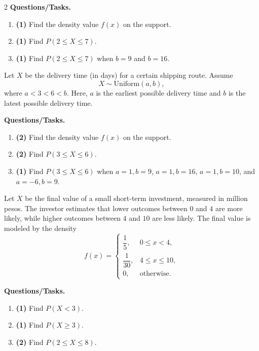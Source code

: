 \begin{multicols}{2}
		\textbf{Questions/Tasks.}
		\begin{enumerate}[label=\textbf{\alph*)}]
			\item \textbf{(1)} Find the density value $f(x)$ on the support.
			\item \textbf{(1)} Find $P(2\le X\le 7)$.
			\item \textbf{(1)} Find $P(2\le X\le 7)$ when $b=9$ and $b=16$.
		\end{enumerate}
		
		\vspace{0.25cm}
		\vspace{-0.3cm}
		Let $X$ be the delivery time (in days) for a certain shipping route. Assume
		\[
		X\sim \text{Uniform}(a,b),
		\]
		where $a<3<6<b$. Here, $a$ is the earliest possible delivery time and $b$ is the latest possible delivery time.
		
		\textbf{Questions/Tasks.}
		\begin{enumerate}[label=\textbf{\alph*)}]
			\item \textbf{(2)} Find the density value $f(x)$ on the support.
			\item \textbf{(2)} Find $P(3\le X\le 6)$.
			\item \textbf{(1)} Find $P(3\le X\le 6)$ when $a=1,b=9$, $a=1,b=16$, $a=1,b=10$, and $a=-6,b=9$.
		\end{enumerate}
		
		\vspace{0.25cm}
		\vspace{-0.3cm}
		Let $X$ be the final value of a small short-term investment, measured in million pesos. The investor estimates that lower outcomes between $0$ and $4$ are more likely, while higher outcomes between $4$ and $10$ are less likely. The final value is modeled by the density
		\[
		f(x)=
		\begin{cases}
			\dfrac{1}{5}, & 0\le x<4,\\
			\dfrac{1}{30}, & 4\le x\le 10,\\
			0, & \text{otherwise.}
		\end{cases}
		\]
		
		\textbf{Questions/Tasks.}
		\begin{enumerate}[label=\textbf{\alph*)}]
			\item \textbf{(1)} Find $P(X < 3)$.
			\item \textbf{(1)} Find $P(X \ge 3)$.
			\item \textbf{(2)} Find $P(2\le X\le 8)$.
		\end{enumerate}
		

\end{multicols}

